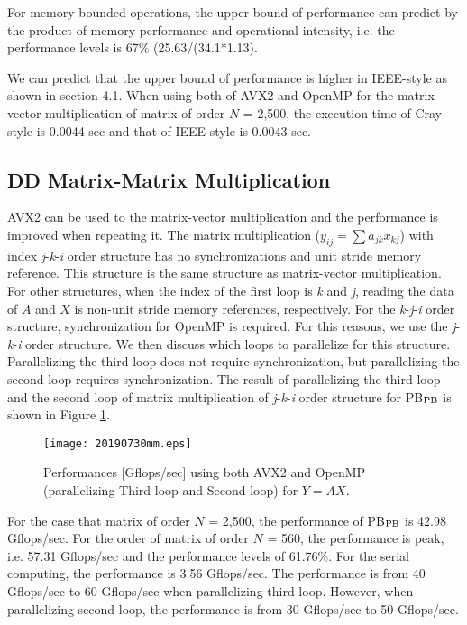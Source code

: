 \documentclass{IOS-Book-Article}
\begin{document}
For memory bounded operations, the upper bound of performance can predict by the product of memory performance and operational intensity, i.e. the performance levels is 67\% (25.63/(34.1*1.13).

We can predict that the upper bound of performance is higher in IEEE-style as shown in section 4.1. When using both of AVX2 and OpenMP for the matrix-vector multiplication of matrix of order $N$ = 2,500, the execution time of Cray-style is 0.0044 sec and that of IEEE-style is 0.0043 sec.

\subsection{DD Matrix-Matrix Multiplication}
AVX2 can be used to the matrix-vector multiplication and the performance is improved when repeating it. The matrix multiplication ($y_{ij}=\sum a_{jk}x_{kj}$) with index {\it j}-{\it k}-{\it i} order structure has no synchronizations and unit stride memory reference. This structure is the same structure as matrix-vector multiplication. For other structures, when the index of the first loop is {\it k} and {\it j}, reading the data of $A$ and $X$ is non-unit stride memory references, respectively. For the {\it k}-{\it j}-{\it i} order structure, synchronization for OpenMP is required. For this reasons, we use the {\it j}-{\it k}-{\it i} order structure. We then discuss which loops to parallelize for this structure. Parallelizing the third loop does not require synchronization, but parallelizing the second loop requires synchronization.
The result of parallelizing the third loop and the second loop of matrix multiplication of {\it j}-{\it k}-{\it i} order structure for PB$_{\rm{PB}}$ is shown in Figure \ref{figMM3}.

\begin{figure}[htbp]
  \begin{center}
    \texttt{[image: 20190730mm.eps]}
         \caption{Performances [Gflops/sec] using both AVX2 and OpenMP (parallelizing Third loop and Second loop) for $Y = AX$.}
    \label{figMM3}
  \end{center}
\end{figure}

For the case that matrix of order $N$ = 2,500, the performance of PB$_{\rm{PB}}$ is 42.98 Gflops/sec.
For the order of matrix of order $N$ = 560, the performance is peak, i.e. 57.31 Gflops/sec and the performance levels of 61.76\%. For the serial computing, the performance is 3.56 Gflops/sec.
The performance is from 40 Gflops/sec to 60 Gflops/sec when parallelizing third loop. However, when parallelizing second loop, the performance is from 30 Gflops/sec to 50 Gflops/sec. 
\end{document}
